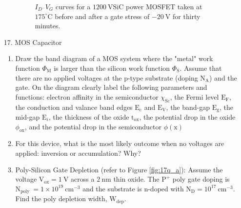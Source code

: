 \documentclass[main.tex]{subfiles}
\begin{document}
\begin{enumerate}
\begin{enumerate}
        \begin{figure}
        \centering{}
        \caption{$I_{D^{-}} V_G$ curves for a $1200 \mathrm{~V} \mathrm{SiC}$ power MOSFET taken at $175^{\circ} \mathrm{C}$ before and after a gate stress of $-20 \mathrm{~V}$ for thirty minutes.}
        \label{fig:16a_f}
        \end{figure}


        
    \end{enumerate}

\item [17.] MOS Capacitor

    \begin{enumerate}
        \item Draw the band diagram of a MOS system where the "metal" work function $\Phi_{\mathrm{M}}$ is larger than the silicon work function $\Phi_{\mathrm{S}}$. Assume that there are no applied voltages at the p-type substrate (doping $\mathrm{N}_{\mathrm{A}}$) and the gate. On the diagram clearly label the following parameters and functions: electron affinity in the semiconductor $\chi_{\mathrm{Sc}}$, the Fermi level $\mathrm{E}_{\mathrm{F}}$, the conduction and valance band edges $\mathrm{E}_{\mathrm{c}}$ and $\mathrm{E}_{\mathrm{V}}$, the band-gap $\mathrm{E}_{\mathrm{g}}$, the mid-gap $\mathrm{E}_{i}$, the thickness of the oxide $\mathrm{t}_{\mathrm{ox}}$, the potential drop in the oxide $\phi_{\mathrm{ox}}$, and the potential drop in the semiconductor $\phi(\mathrm{x})$
        \item For this device, what is the most likely outcome when no voltages are applied: inversion or accumulation? Why?
        \item Poly-Silicon Gate Depletion (refer to Figure \ref{fig:17q_a}): Assume the voltage $\mathrm{V}_{\mathrm{ox}} = \qty{1}{\volt}$ across a $\qty{2}{\nano\meter}$ thin  oxide. The $\mathrm{P}^{+}$ poly gate doping is $\mathrm{N}_{\text {poly }}=1 \times 10^{19} \mathrm{~cm}^{-3}$ and the substrate is n-doped with $\mathrm{N}_{\mathrm{D}}=10^{17} \mathrm{~cm}^{-3}$. Find the poly depletion width, $\mathrm{W}_{\mathrm{dep }}$.
    \end{enumerate}
    

\end{enumerate}
\end{document}
